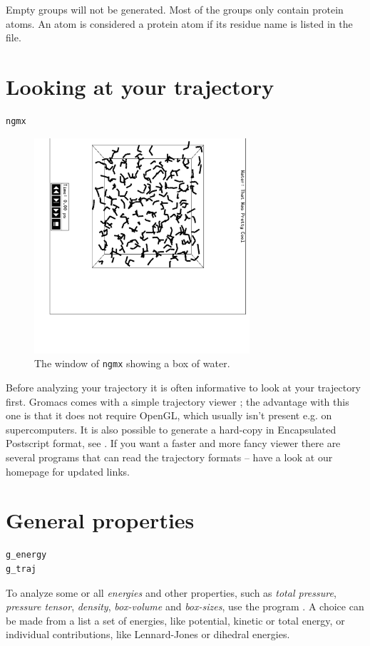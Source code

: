 Empty groups will not be generated.
Most of the groups only contain protein atoms.
An atom is considered a protein atom if its residue name is listed
in the {\tt {}} file.


\section{Looking at your trajectory}
\label{sec:lookwhostalking}
\begin{verbatim}
ngmx
\end{verbatim}

\begin{figure}
\centerline{
{\includegraphics[width=8cm,angle=90]{plots/ngmxdump}}}
\caption{The window of {\tt ngmx} showing a box of water.}
\label{fig:ngmxdump}
\end{figure}

Before analyzing your trajectory it is often informative to look at
your trajectory first. Gromacs comes with a simple trajectory
viewer {\tt {}}; the advantage with this one is that it does not
require OpenGL, which usually isn't present e.g. on supercomputers.
It is also possible to generate a
hard-copy in Encapsulated Postscript format, see
. If you want a faster and more fancy viewer
 there are several programs
that can read the {\gromacs} trajectory formats -- have a look at our
homepage {\wwwpage} for updated links. 


\section{General properties}
\label{sec:genprop}
\begin{verbatim}
g_energy
g_traj
\end{verbatim}
To analyze some or all {\em energies} and other properties, such as
{\em total pressure}, {\em pressure tensor}, {\em density}, {\em
box-volume} and {\em box-sizes}, use the program {\tt {}}.  A
choice can be made from a list a set of energies, like potential,
kinetic or total energy, or individual contributions, like
Lennard-Jones or dihedral energies.

